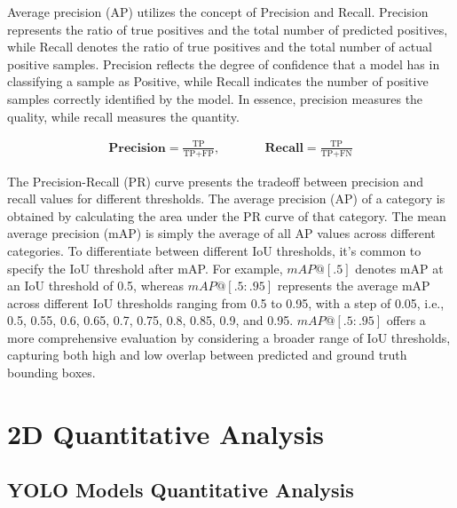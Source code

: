 Average precision (AP) utilizes the concept of Precision and Recall. Precision represents the ratio of true positives and the total number of predicted positives, while Recall denotes the ratio of true positives and the total number of actual positive samples. Precision reflects the degree of confidence that a model has in classifying a sample as Positive, while Recall indicates the number of positive samples correctly identified by the model. In essence, precision measures the quality, while recall measures the quantity. 

\begin{align*}
	\textbf{Precision} = \frac{\text{TP}}{\text{TP} + \text{FP}}, &\quad &\quad\textbf{Recall} = \frac{\text{TP}}{\text{TP} + \text{FN}}
\end{align*}

The Precision-Recall (PR) curve presents the tradeoff between precision and recall values for different thresholds. The average precision (AP) of a category is obtained by calculating the area under the PR curve of that category. The mean average precision (mAP) is simply the average of all AP values across different categories. To differentiate between different IoU thresholds, it's common to specify the IoU threshold after mAP. For example, $mAP@[.5]$ denotes mAP at an IoU threshold of 0.5, whereas $mAP@[.5 : .95]$ represents the average mAP across different IoU thresholds ranging from 0.5 to 0.95, with a step of 0.05, i.e., 0.5, 0.55, 0.6, 0.65, 0.7, 0.75, 0.8, 0.85, 0.9, and 0.95. $mAP@[.5 : .95]$ offers a more comprehensive evaluation by considering a broader range of IoU thresholds, capturing both high and low overlap between predicted and ground truth bounding boxes.

\section{2D Quantitative Analysis}  \label{sec:quan_2d}

\subsection{YOLO Models Quantitative Analysis}

